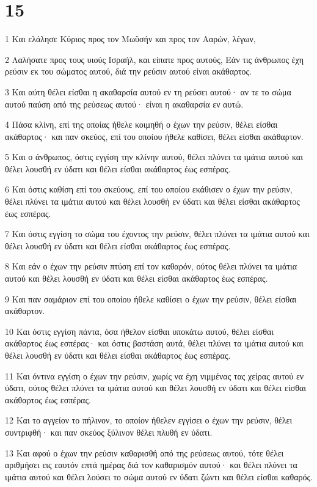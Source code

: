 \chapter{15}

\par 1 Και ελάλησε Κύριος προς τον Μωϋσήν και προς τον Ααρών, λέγων,
\par 2 Λαλήσατε προς τους υιούς Ισραήλ, και είπατε προς αυτούς, Εάν τις άνθρωπος έχη ρεύσιν εκ του σώματος αυτού, διά την ρεύσιν αυτού είναι ακάθαρτος.
\par 3 Και αύτη θέλει είσθαι η ακαθαρσία αυτού εν τη ρεύσει αυτού· αν τε το σώμα αυτού παύση από της ρεύσεως αυτού· είναι η ακαθαρσία εν αυτώ.
\par 4 Πάσα κλίνη, επί της οποίας ήθελε κοιμηθή ο έχων την ρεύσιν, θέλει είσθαι ακάθαρτος· και παν σκεύος, επί του οποίου ήθελε καθίσει, θέλει είσθαι ακάθαρτον.
\par 5 Και ο άνθρωπος, όστις εγγίση την κλίνην αυτού, θέλει πλύνει τα ιμάτια αυτού και θέλει λουσθή εν ύδατι και θέλει είσθαι ακάθαρτος έως εσπέρας.
\par 6 Και όστις καθίση επί του σκεύους, επί του οποίου εκάθισεν ο έχων την ρεύσιν, θέλει πλύνει τα ιμάτια αυτού και θέλει λουσθή εν ύδατι και θέλει είσθαι ακάθαρτος έως εσπέρας.
\par 7 Και όστις εγγίση το σώμα του έχοντος την ρεύσιν, θέλει πλύνει τα ιμάτια αυτού και θέλει λουσθή εν ύδατι και θέλει είσθαι ακάθαρτος έως εσπέρας.
\par 8 Και εάν ο έχων την ρεύσιν πτύση επί τον καθαρόν, ούτος θέλει πλύνει τα ιμάτια αυτού και θέλει λουσθή εν ύδατι και θέλει είσθαι ακάθαρτος έως εσπέρας.
\par 9 Και παν σαμάριον επί του οποίου ήθελε καθίσει ο έχων την ρεύσιν, θέλει είσθαι ακάθαρτον.
\par 10 Και όστις εγγίση πάντα, όσα ήθελον είσθαι υποκάτω αυτού, θέλει είσθαι ακάθαρτος έως εσπέρας· και όστις βαστάση αυτά, θέλει πλύνει τα ιμάτια αυτού και θέλει λουσθή εν ύδατι και θέλει είσθαι ακάθαρτος έως εσπέρας.
\par 11 Και όντινα εγγίση ο έχων την ρεύσιν, χωρίς να έχη νιμμένας τας χείρας αυτού εν ύδατι, ούτος θέλει πλύνει τα ιμάτια αυτού και θέλει λουσθή εν ύδατι και θέλει είσθαι ακάθαρτος έως εσπέρας.
\par 12 Και το αγγείον το πήλινον, το οποίον ήθελεν εγγίσει ο έχων την ρεύσιν, θέλει συντριφθή· και παν σκεύος ξύλινον θέλει πλυθή εν ύδατι.
\par 13 Και αφού ο έχων την ρεύσιν καθαρισθή από της ρεύσεως αυτού, τότε θέλει αριθμήσει εις εαυτόν επτά ημέρας διά τον καθαρισμόν αυτού· και θέλει πλύνει τα ιμάτια αυτού και θέλει λούσει το σώμα αυτού εν ύδατι ζώντι και θέλει είσθαι καθαρός.
